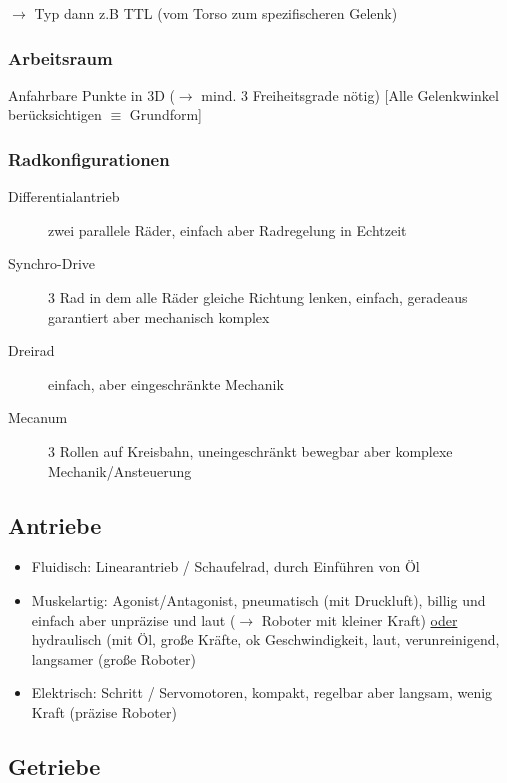 $\rightarrow$ Typ dann z.B TTL (vom Torso zum spezifischeren Gelenk)

\subsubsection{Arbeitsraum}

Anfahrbare Punkte in 3D ($\to$ mind. 3 Freiheitsgrade nötig) [Alle Gelenkwinkel berücksichtigen $\equiv$ Grundform]

\subsubsection{Radkonfigurationen}

\begin{description}
	\item[Differentialantrieb] zwei parallele Räder, einfach aber Radregelung in Echtzeit
	\item[Synchro-Drive] 3 Rad in dem alle Räder gleiche Richtung lenken, einfach, geradeaus garantiert aber mechanisch komplex
	\item[Dreirad] einfach, aber eingeschränkte Mechanik
	\item[Mecanum] 3 Rollen auf Kreisbahn, uneingeschränkt bewegbar aber komplexe Mechanik/Ansteuerung
\end{description}

\subsection{Antriebe}

\begin{itemize}
	\item Fluidisch: Linearantrieb / Schaufelrad, durch Einführen von Öl
	\item Muskelartig: Agonist/Antagonist, pneumatisch (mit Druckluft), billig und einfach aber unpräzise und laut ($\to$ Roboter mit kleiner Kraft) \underline{oder} hydraulisch (mit Öl, große Kräfte, ok Geschwindigkeit, laut, verunreinigend, langsamer (große Roboter)
	\item Elektrisch: Schritt / Servomotoren, kompakt, regelbar aber langsam, wenig Kraft (präzise Roboter) \\
\end{itemize}

\subsection{Getriebe}

